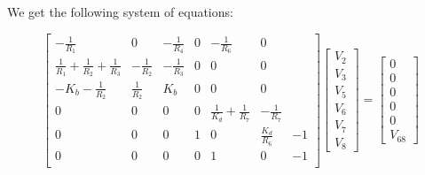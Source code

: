 We get the following system of equations:

\[
  \begin{bmatrix}
    -\frac{1}{R_1}                                & 0              & -\frac{1}{R_4} & 0 & -\frac{1}{R_6}                & 0                    \\
    \frac{1}{R_1} + \frac{1}{R_2} + \frac{1}{R_3} & -\frac{1}{R_2} & -\frac{1}{R_3} & 0 & 0                             & 0                    \\
    -K_b - \frac{1}{R_2}                          & \frac{1}{R_2}  & K_b            & 0 & 0                             & 0                    \\
    0                                             & 0              & 0              & 0 & \frac{1}{K_d} + \frac{1}{R_7} & -\frac{1}{R_7}       \\
    0                                             & 0              & 0              & 1 & 0                             & \frac{K_d}{R_6} & -1 \\
    0                                             & 0              & 0              & 0 & 1                             & 0               & -1 \\
  \end{bmatrix}
  \begin{bmatrix}
    V_2 \\ V_3 \\ V_5 \\ V_6 \\ V_7 \\ V_8
  \end{bmatrix}
  =
  \begin{bmatrix}
    0 \\ 0 \\ 0 \\ 0  \\ 0 \\ V_{68}
  \end{bmatrix}
\]

\hfill


